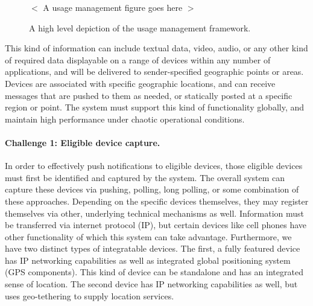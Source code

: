 \documentclass{sbir}
\begin{document}
\begin{figure}
 \vspace{1in}
 \begin{center}
  $<$ A usage management figure goes here $>$
  \end{center}
 \vspace{1in}
  \caption{A high level depiction of the usage management framework.}\label{UM}
 \end{figure}


This kind of information can include textual data, video, audio, or any other kind of required data displayable on a range of devices within any number of applications, and will be  delivered to sender-specified geographic points or areas.  Devices are associated with specific geographic locations, and can receive messages that are pushed to them as needed, or statically posted at a specific region or point.  The system must support this kind of functionality globally, and maintain high performance under chaotic operational conditions.

\paragraph{Challenge 1: Eligible device capture.}  In order to effectively push notifications to eligible devices, those eligible devices must first be identified and captured by the system.  The overall system can capture these devices via pushing, polling, long polling, or some combination of these approaches.  Depending on the specific devices themselves, they may register themselves via other, underlying technical mechanisms as well.  Information must be transferred via internet protocol (IP), but certain devices like cell phones have other functionality of which this system can take advantage.  Furthermore, we have two distinct types of integratable devices.  The first, a fully featured device has IP networking capabilities as well as integrated global positioning system (GPS components).  This kind of device can be standalone and has an integrated sense of location.  The second device has IP networking capabilities as well, but uses geo-tethering to supply location services.
\end{document}
